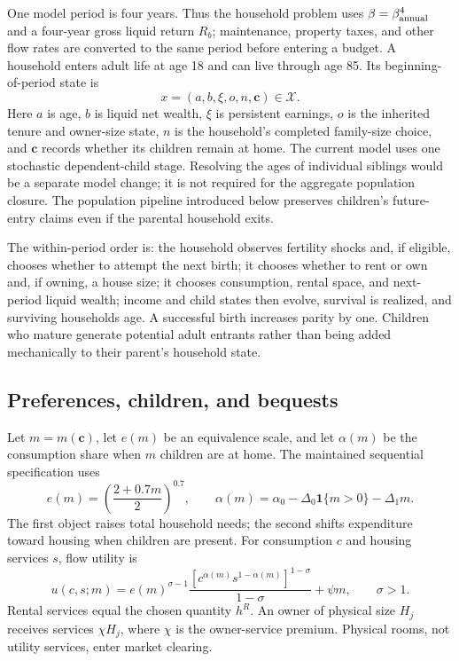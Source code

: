 \documentclass[11pt]{article}
\theoremstyle{definition}
\newcommand{\1}{\mathbf 1}
\newcommand{\X}{\mathcal X}
\begin{document}
One model period is four years. Thus the household problem uses
$\beta=\beta_{\rm annual}^{4}$ and a four-year gross liquid return $R_b$;
maintenance, property taxes, and other flow rates are converted to the same
period before entering a budget. A household enters adult life at age 18 and
can live through age 85. Its beginning-of-period state is
\begin{equation}
 x=(a,b,\xi,o,n,\mathbf c)\in\X.
 \label{eq:full_state}
\end{equation}
Here $a$ is age, $b$ is liquid net wealth, $\xi$ is persistent earnings, $o$ is
the inherited tenure and owner-size state, $n$ is the household's completed
family-size choice, and $\mathbf c$ records whether its children remain at
home. The current model uses one stochastic dependent-child stage. Resolving
the ages of individual siblings would be a separate model change; it is not
required for the aggregate population closure. The population pipeline
introduced below preserves children's future-entry claims even if the parental
household exits.

The within-period order is: the household observes fertility shocks and, if
eligible, chooses whether to attempt the next birth; it chooses whether to
rent or own and, if owning, a house size; it chooses consumption, rental space,
and next-period liquid wealth; income and child states then evolve, survival is
realized, and surviving households age. A successful birth increases parity by
one. Children who mature generate potential adult entrants rather than being
added mechanically to their parent's household state.

\subsection{Preferences, children, and bequests}

Let $m=m(\mathbf c)$, let $e(m)$ be an equivalence scale, and let $\alpha(m)$ be
the consumption share when $m$ children are at home. The maintained sequential
specification uses
\begin{equation}
 e(m)=\left(\frac{2+0.7m}{2}\right)^{0.7},
 \qquad
 \alpha(m)=\alpha_0-\Delta_0\1\{m>0\}-\Delta_1 m.
 \label{eq:eqscale}
\end{equation}
The first object raises total household needs; the second shifts expenditure
toward housing when children are present. For consumption $c$ and housing
services $s$, flow utility is
\begin{equation}
 u(c,s;m)
 =e(m)^{\sigma-1}
 \frac{\left[c^{\alpha(m)}s^{1-\alpha(m)}\right]^{1-\sigma}}
 {1-\sigma}
 +\psi m,
 \qquad \sigma>1.
 \label{eq:full_utility}
\end{equation}
Rental services equal the chosen quantity $h^R$. An owner of physical size
$H_j$ receives services $\chi H_j$, where $\chi$ is the owner-service premium.
Physical rooms, not utility services, enter market clearing.
\end{document}
